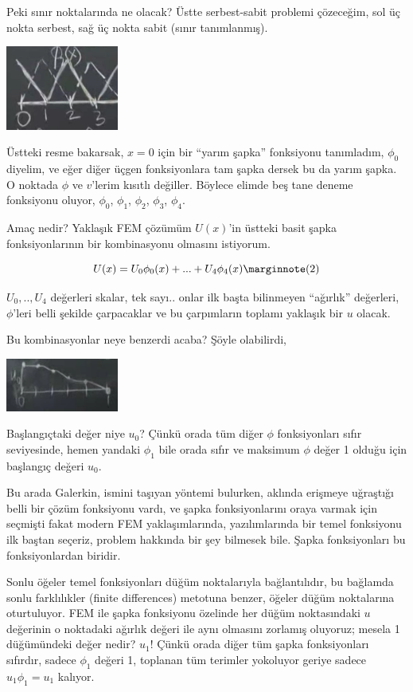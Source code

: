 \documentclass[12pt,fleqn]{article}\usepackage{../../common}
\begin{document}
Peki sınır noktalarında ne olacak? Üstte serbest-sabit problemi çözeceğim,
sol üç nokta serbest, sağ üç nokta sabit (sınır tanımlanmış). 

\includegraphics[width=10em]{compscieng_1_18_02.png}

Üstteki resme bakarsak, $x=0$ için bir ``yarım şapka'' fonksiyonu tanımladım,
$\phi_0$ diyelim, ve eğer diğer üçgen fonksiyonlara tam şapka dersek bu da yarım
şapka. O noktada $\phi$ ve $v$'lerim kısıtlı değiller. Böylece elimde beş tane
deneme fonksiyonu oluyor, $\phi_0$, $\phi_1$, $\phi_2$, $\phi_3$, $\phi_4$.

Amaç nedir? Yaklaşık FEM çözümüm $U(x)$'in üstteki basit şapka fonksiyonlarının
bir kombinasyonu olmasını istiyorum.

$$
U(x) = U_0 \phi_0(x) + ... + U_4 \phi_4(x)
\mlabel{2}
$$

$U_0,..,U_4$ değerleri skalar, tek sayı.. onlar ilk başta bilinmeyen ``ağırlık''
değerleri, $\phi$'leri belli şekilde çarpacaklar ve bu çarpımların toplamı
yaklaşık bir $u$ olacak.

Bu kombinasyonlar neye benzerdi acaba? Şöyle olabilirdi,

\includegraphics[width=10em]{compscieng_1_18_03.png}

Başlangıçtaki değer niye $u_0$? Çünkü orada tüm diğer $\phi$ fonksiyonları sıfır
seviyesinde, hemen yandaki $\phi_1$ bile orada sıfır ve maksimum $\phi$ değer 1
olduğu için başlangıç değeri $u_0$.

Bu arada Galerkin, ismini taşıyan yöntemi bulurken, aklında erişmeye uğraştığı
belli bir çözüm fonksiyonu vardı, ve şapka fonksiyonlarını oraya varmak için
seçmişti fakat modern FEM yaklaşımlarında, yazılımlarında bir temel fonksiyonu
ilk baştan seçeriz, problem hakkında bir şey bilmesek bile. Şapka fonksiyonları
bu fonksiyonlardan biridir.

Sonlu öğeler temel fonksiyonları düğüm noktalarıyla bağlantılıdır, bu bağlamda
sonlu farklılıkler (finite differences) metotuna benzer, öğeler düğüm
noktalarına oturtuluyor. FEM ile şapka fonksiyonu özelinde her düğüm
noktasındaki $u$ değerinin o noktadaki ağırlık değeri ile aynı olmasını zorlamış
oluyoruz; mesela 1 düğümündeki değer nedir? $u_1$! Çünkü orada diğer tüm şapka
fonksiyonları sıfırdır, sadece $\phi_1$ değeri 1, toplanan tüm terimler
yokoluyor geriye sadece $u_1 \phi_1 = u_1$ kalıyor.
\end{document}
